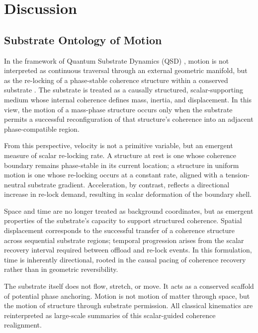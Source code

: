 \documentclass[entropy,article,submit,pdftex,moreauthors]{Definitions/mdpi}
\begin{document}

\section{Discussion}
\subsection{Substrate Ontology of Motion}

In the framework of Quantum Substrate Dynamics (QSD) \cite{bush2025}, motion is not interpreted as continuous traversal through an external geometric manifold, but as the re-locking of a phase-stable coherence structure within a conserved substrate \cite{bush-coherence}. The substrate is treated as a causally structured, scalar-supporting medium whose internal coherence defines mass, inertia, and displacement. In this view, the motion of a mass-phase structure occurs only when the substrate permits a successful reconfiguration of that structure’s coherence into an adjacent phase-compatible region.

From this perspective, velocity is not a primitive variable, but an emergent measure of scalar re-locking rate. A structure at rest is one whose coherence boundary remains phase-stable in its current location; a structure in uniform motion is one whose re-locking occurs at a constant rate, aligned with a tension-neutral substrate gradient. Acceleration, by contrast, reflects a directional increase in re-lock demand, resulting in scalar deformation of the boundary shell.

Space and time are no longer treated as background coordinates, but as emergent properties of the substrate's capacity to support structured coherence. Spatial displacement corresponds to the successful transfer of a coherence structure across sequential substrate regions; temporal progression arises from the scalar recovery interval required between offload and re-lock events. In this formulation, time is inherently directional, rooted in the causal pacing of coherence recovery rather than in geometric reversibility.

The substrate itself does not flow, stretch, or move. It acts as a conserved scaffold of potential phase anchoring. Motion is not motion of matter through space, but the motion of structure through substrate permission. All classical kinematics are reinterpreted as large-scale summaries of this scalar-guided coherence realignment.
\end{document}
